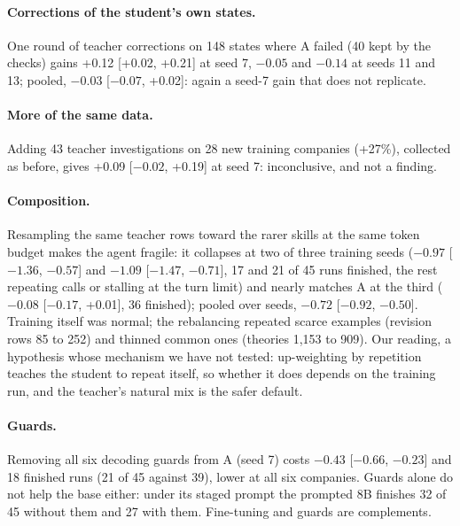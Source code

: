 \documentclass[11pt]{article}
\begin{document}
\paragraph{Corrections of the student's own states.} One round of teacher corrections on 148 states where A failed
(40 kept by the checks) gains +0.12 [+0.02, +0.21] at seed 7, $-0.05$ and $-0.14$ at seeds 11 and 13; pooled,
$-0.03$ [$-0.07$, +0.02]: again a seed-7 gain that does not replicate.

\paragraph{More of the same data.} Adding 43 teacher investigations on 28 new training companies (+27\%), collected
as before, gives +0.09 [$-0.02$, +0.19] at seed 7: inconclusive, and not a finding.

\paragraph{Composition.} Resampling the same teacher rows toward the rarer skills at the same token budget makes
the agent fragile: it collapses at two of three training seeds ($-0.97$ [$-1.36$, $-0.57$] and $-1.09$ [$-1.47$,
$-0.71$], 17 and 21 of 45 runs finished, the rest repeating calls or stalling at the turn limit) and nearly matches A
at the third ($-0.08$ [$-0.17$, +0.01], 36 finished); pooled over seeds, $-0.72$ [$-0.92$, $-0.50$]. Training itself
was normal; the rebalancing repeated scarce examples (revision rows 85 to 252) and thinned common ones (theories 1,153
to 909). Our reading, a hypothesis whose mechanism we have not tested: up-weighting by repetition teaches the student
to repeat itself, so whether it does depends on the training run, and the teacher's natural mix is the safer default.

\paragraph{Guards.} Removing all six decoding guards from A (seed 7) costs $-0.43$ [$-0.66$, $-0.23$] and 18 finished
runs (21 of 45 against 39), lower at all six companies. Guards alone do not help the base either: under its staged
prompt the prompted 8B finishes 32 of 45 without them and 27 with them. Fine-tuning and guards are complements.
\end{document}

